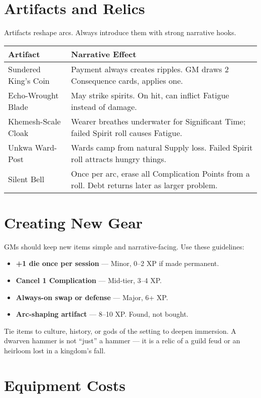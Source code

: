 \documentclass[12pt]{article}
\begin{document}
\section{Artifacts and Relics}
Artifacts reshape arcs. Always introduce them with strong narrative hooks.

\begin{tabularx}{\textwidth}{lX}
\textbf{Artifact} & \textbf{Narrative Effect} \\
\hline
Sundered King’s Coin & Payment always creates ripples. GM draws 2 Consequence cards, applies one. \\
Echo-Wrought Blade & May strike spirits. On hit, can inflict Fatigue instead of damage. \\
Khemesh-Scale Cloak & Wearer breathes underwater for Significant Time; failed Spirit roll causes Fatigue. \\
Unkwa Ward-Post & Wards camp from natural Supply loss. Failed Spirit roll attracts hungry things. \\
Silent Bell & Once per arc, erase all Complication Points from a roll. Debt returns later as larger problem. \\
\end{tabularx}

\section{Creating New Gear}
GMs should keep new items simple and narrative-facing. Use these guidelines:
\begin{itemize}
  \item \textbf{+1 die once per session} — Minor, 0–2 XP if made permanent.  
  \item \textbf{Cancel 1 Complication} — Mid-tier, 3–4 XP.  
  \item \textbf{Always-on swap or defense} — Major, 6+ XP.  
  \item \textbf{Arc-shaping artifact} — 8–10 XP. Found, not bought.  
\end{itemize}

Tie items to culture, history, or gods of the setting to deepen immersion.  
A dwarven hammer is not “just” a hammer — it is a relic of a guild feud or an heirloom lost in a kingdom’s fall.

\section{Equipment Costs}
\end{document}
